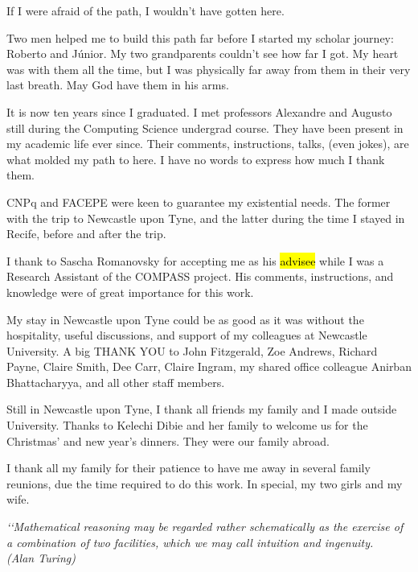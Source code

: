 \documentclass[12pt,openright,twoside,a4paper,oldfontcommands,english,brazil,draft]{abntex2}
\theoremstyle{theo}
\begin{document}
\begin{agradecimentos}

If I were afraid of the path, I wouldn't have gotten here.

Two men helped me to build this path far before I started my scholar journey: Roberto and Júnior.
My two grandparents couldn't see how far I got.
My heart was with them all the time, but I was physically far away from them in their very last breath.
May God have them in his arms.

It is now ten years since I graduated.
I met professors Alexandre and Augusto still during the Computing Science undergrad course.
They have been present in my academic life ever since.
Their comments, instructions, talks, (even jokes), are what molded my path to here.
I have no words to express how much I thank them.

CNPq and FACEPE were keen to guarantee my existential needs.
The former with the trip to Newcastle upon Tyne, and the latter during the time I stayed in Recife, before and after the trip.

I thank to Sascha Romanovsky for accepting me as his \hl{advisee} while I was a Research Assistant of the COMPASS project.
His comments, instructions, and knowledge were of great importance for this work.

My stay in Newcastle upon Tyne could be as good as it was without the hospitality, useful discussions, and support of my colleagues at Newcastle University.
A big THANK YOU to John Fitzgerald, Zoe Andrews, Richard Payne, Claire Smith, Dee Carr, Claire Ingram, my shared office colleague Anirban Bhattacharyya, and all other staff members.

Still in Newcastle upon Tyne, I thank all friends my family and I made outside University.
Thanks to Kelechi Dibie and her family to welcome us for the Christmas' and new year's dinners.
They were our family abroad.

I thank all my family for their patience to have me away in several family reunions, due the time required to do this work.
In special, my two girls and my wife.

\end{agradecimentos}

\begin{epigrafe}

  \vspace*{\fill}
  \begin{flushright}
  \textit{‘‘Mathematical reasoning may be regarded
  rather schematically as the exercise of a combination of two facilities,
  which we may call intuition and ingenuity.\\
  (Alan Turing)}
  \end{flushright}

\end{epigrafe}
\end{document}
